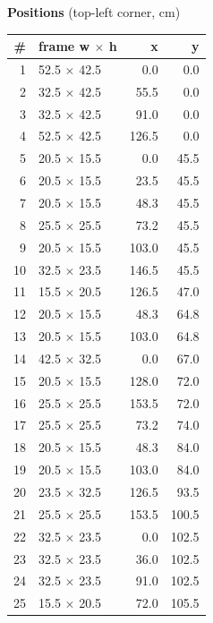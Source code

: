 \documentclass[a4paper,landscape,10pt]{article}
\begin{document}
\begin{minipage}[t]{0.25\textwidth}
\vspace{8pt}
{\bfseries Positions} (top-left corner, cm)\\[2pt]
\tiny
\begin{tabular}{@{}r l r r@{}}
\toprule
\# & frame w $\times$ h & x & y \\
\midrule
1 & 52.5 $\times$ 42.5 & 0.0 & 0.0 \\
2 & 32.5 $\times$ 42.5 & 55.5 & 0.0 \\
3 & 32.5 $\times$ 42.5 & 91.0 & 0.0 \\
4 & 52.5 $\times$ 42.5 & 126.5 & 0.0 \\
5 & 20.5 $\times$ 15.5 & 0.0 & 45.5 \\
6 & 20.5 $\times$ 15.5 & 23.5 & 45.5 \\
7 & 20.5 $\times$ 15.5 & 48.3 & 45.5 \\
8 & 25.5 $\times$ 25.5 & 73.2 & 45.5 \\
9 & 20.5 $\times$ 15.5 & 103.0 & 45.5 \\
10 & 32.5 $\times$ 23.5 & 146.5 & 45.5 \\
11 & 15.5 $\times$ 20.5 & 126.5 & 47.0 \\
12 & 20.5 $\times$ 15.5 & 48.3 & 64.8 \\
13 & 20.5 $\times$ 15.5 & 103.0 & 64.8 \\
14 & 42.5 $\times$ 32.5 & 0.0 & 67.0 \\
15 & 20.5 $\times$ 15.5 & 128.0 & 72.0 \\
16 & 25.5 $\times$ 25.5 & 153.5 & 72.0 \\
17 & 25.5 $\times$ 25.5 & 73.2 & 74.0 \\
18 & 20.5 $\times$ 15.5 & 48.3 & 84.0 \\
19 & 20.5 $\times$ 15.5 & 103.0 & 84.0 \\
20 & 23.5 $\times$ 32.5 & 126.5 & 93.5 \\
21 & 25.5 $\times$ 25.5 & 153.5 & 100.5 \\
22 & 32.5 $\times$ 23.5 & 0.0 & 102.5 \\
23 & 32.5 $\times$ 23.5 & 36.0 & 102.5 \\
24 & 32.5 $\times$ 23.5 & 91.0 & 102.5 \\
25 & 15.5 $\times$ 20.5 & 72.0 & 105.5 \\
\bottomrule
\end{tabular}
\end{minipage}
\clearpage
\end{document}
